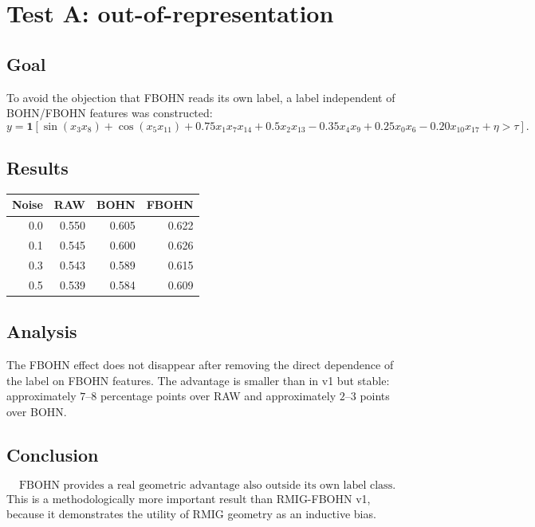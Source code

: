 \section{Test A: out-of-representation}
\label{sec:test_a_oor}

\subsection{Goal}
To avoid the objection that FBOHN reads its own label, a label independent of BOHN/FBOHN features was constructed:
\[
y=\mathbf{1}\!\left[
\sin(x_3x_8)+\cos(x_5x_{11})+0.75x_1x_7x_{14}+0.5x_2x_{13}
-0.35x_4x_9+0.25x_0x_6-0.20x_{10}x_{17}+\eta>\tau
\right].
\]

\subsection{Results}
\begin{center}
\begin{tabular}{rrrr}
\toprule
Noise & RAW & BOHN & FBOHN\\
\midrule
0.0 & 0.550 & 0.605 & 0.622\\
0.1 & 0.545 & 0.600 & 0.626\\
0.3 & 0.543 & 0.589 & 0.615\\
0.5 & 0.539 & 0.584 & 0.609\\
\bottomrule
\end{tabular}
\end{center}

\subsection{Analysis}
The FBOHN effect does not disappear after removing the direct dependence of the label on FBOHN features. The advantage is smaller than in v1 but stable: approximately $7$--$8$ percentage points over RAW and approximately $2$--$3$ points over BOHN.

\subsection{Conclusion}
\[
\boxed{\text{FBOHN provides a real geometric advantage also outside its own label class.}}
\]
This is a methodologically more important result than RMIG-FBOHN v1, because it demonstrates the utility of RMIG geometry as an inductive bias.
